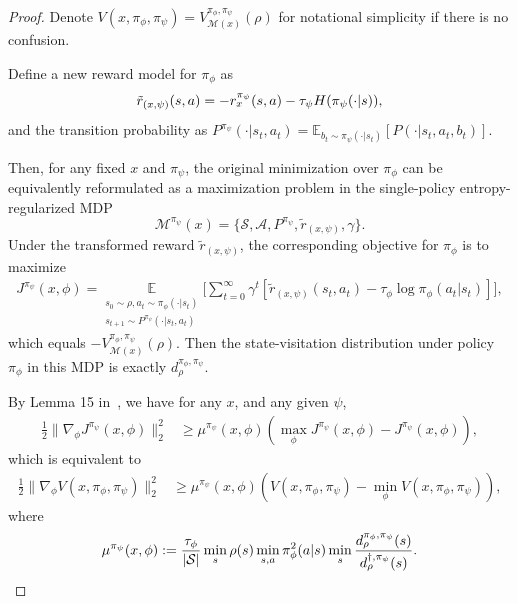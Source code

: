 \documentclass{article}
\theoremstyle{plain}
\theoremstyle{definition}
\theoremstyle{remark}
\def\cM{\mathcal M}
\def\cS{\mathcal S}
\begin{document}
\begin{proof}
    Denote $V(x,\pi_\phi,\pi_\psi) = V^{\pi_\phi,\pi_\psi}_{\cM(x)}(\rho)$ for notational simplicity if there is no confusion.

Define a new reward model for $\pi_\phi$ as
\begin{align}
        \tilde{r}_{(x,\psi)}(s,a) = - r^{\pi_\psi}_x(s,a) - \tau_\psi H(\pi_\psi(\cdot|s)), \notag
\end{align}
    and the transition probability as $P^{\pi_\psi}(\cdot|s_t,a_t) = \mathbb{E}_{b_t \sim \pi_\psi(\cdot|s_t)}[P(\cdot|s_t,a_t,b_t)]$.

Then, for any fixed $x$ and $\pi_\psi$, the original minimization over
$\pi_\phi$ can be equivalently reformulated as a maximization problem in the
single-policy entropy-regularized MDP
\[
\mathcal{M}^{\pi_\psi}(x)
=
\{\mathcal{S},\mathcal{A},P^{\pi_\psi},
\tilde r_{(x,\psi)},\gamma\}.
\]
Under the transformed reward $\tilde r_{(x,\psi)}$, the corresponding
objective for $\pi_\phi$ is to maximize
\begin{align}
        J^{\pi_\psi}(x,\phi) = \underset{\substack{s_0 \sim \rho, a_t \sim \pi_\phi(\cdot|s_t) \\s_{t+1} \sim P^{\pi_\psi}(\cdot|s_t,a_t)}}{\mathbb{E}} \bigg[
            \sum_{t=0}^{\infty} \gamma^t \left[
                \tilde{r}_{(x,\psi)}(s_t,a_t) - \tau_\phi \log \pi_\phi(a_t|s_t)
            \right]   
        \bigg] ,
    \end{align}
    which equals $- V^{\pi_\phi,\pi_\psi}_{\cM(x)}(\rho)$.
    Then the state-visitation distribution under policy $\pi_\phi$ in this MDP is exactly $d^{\pi_\phi,\pi_\psi}_\rho$.

    By Lemma 15 in~\citet{mei2020global}, we have for any $x$, and any given $\psi$,
    \begin{align}
        \frac{1}{2}\| \nabla_{\phi} J^{\pi_\psi}(x,\phi) \|_2^2  & \geq \mu^{\pi_\psi}(x,\phi)\left(  \max_\phi J^{\pi_\psi}(x,\phi) - J^{\pi_\psi}(x,\phi) \right),
    \end{align}
    which is equivalent to
    \begin{align}
        \frac{1}{2}\| \nabla_{\phi} V(x,\pi_\phi,\pi_\psi) \|_2^2  & \geq \mu^{\pi_\psi}(x,\phi) \left(   V(x,\pi_\phi,\pi_\psi) -\min_\phi V(x,\pi_\phi,\pi_\psi)\right) , \label{eq: pl-condition-on-soft-joint-value-function-phi}
    \end{align}
    where
    \begin{align}
        \mu^{\pi_\psi}(x,\phi) := \frac{\tau_\phi}{|\cS|}  \min_s \rho(s) \min_{s,a} \pi_\phi^2(a|s) \min_s \frac{d^{\pi_\phi,\pi_\psi}_\rho (s) }{d^{\dag,\pi_\psi}_\rho(s)} . \notag
    \end{align}
 

\end{proof}
\end{document}
